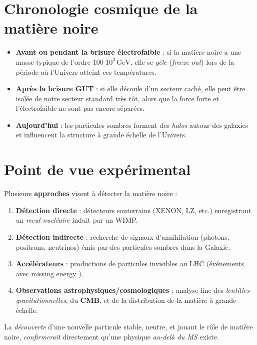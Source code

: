 \documentclass[12pt]{article}
\begin{document}
\section{Chronologie cosmique de la matière noire}
\label{sec:chronologie_mn}

\begin{itemize}
  \item \textbf{Avant ou pendant la brisure électrofaible} : si la matière noire a une masse typique de l’ordre \(100\text{-}10^3\,\mathrm{GeV}\), elle se \emph{gèle} (\emph{freeze-out}) lors de la période où l’Univers atteint ces températures.
  \item \textbf{Après la brisure GUT} : si elle découle d’un secteur caché, elle peut être \og isolée \fg{} de notre secteur standard très tôt, alors que la force forte et l’électrofaible ne sont pas encore séparées.
  \item \textbf{Aujourd’hui} : les particules sombres forment des \emph{halos} autour des galaxies et influencent la structure à grande échelle de l’Univers.
\end{itemize}

\section{Point de vue expérimental}
\label{sec:experiment}

Plusieurs \textbf{approches} visent à détecter la matière noire \cite{darkmatterreview} :

\begin{enumerate}
  \item \textbf{Détection directe} : détecteurs souterrains (XENON, LZ, etc.) enregistrant un \emph{recul nucléaire} induit par un WIMP.
  \item \textbf{Détection indirecte} : recherche de signaux d’annihilation (photons, positrons, neutrinos) émis par des particules sombres dans la Galaxie.
  \item \textbf{Accélérateurs} : productions de particules invisibles au LHC (événements avec \og missing energy \fg).
  \item \textbf{Observations astrophysiques/cosmologiques} : analyse fine des \emph{lentilles gravitationnelles}, du \textbf{CMB}, et de la distribution de la matière à grande échelle.
\end{enumerate}

La \emph{découverte} d’une nouvelle particule stable, neutre, et jouant le rôle de matière noire, \emph{confirmerait} directement qu’une physique \emph{au-delà du MS} existe.
\end{document}
